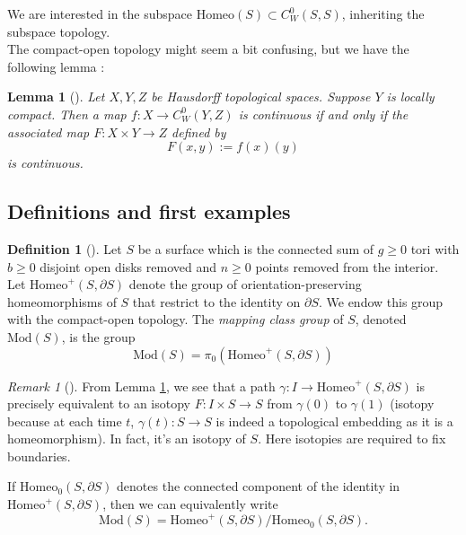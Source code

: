 \documentclass[reqno]{amsart}
\newtheorem{lemma}[theorem]{Lemma}
\theoremstyle{definition}
\newtheorem{definition}[theorem]{Definition}
\theoremstyle{remark}
\newtheorem*{remark}{Remark}
\newcommand{\Mod}{{\mathrm{Mod}}}
\newcommand{\Homeo}{{\mathrm{Homeo}}}
\begin{document}
We are interested in the subspace
$\Homeo (S) \subset C_W^{0} (S,S)$, inheriting the
subspace topology.\\
\linebreak
The compact-open topology might seem a bit confusing, but
we have the following lemma \cite[Prop A.14]{Hatcher}:

\begin{lemma}[]\label{compact-open-isotopy}
    Let $X,Y,Z$ be Hausdorff topological spaces.
    Suppose $Y$ is locally compact. Then a 
    map $f \colon X \to C_W^{0}(Y,Z)$ is
    continuous if and only if the associated map
    $F \colon X \times Y \to Z$ defined by
    \[
    F(x,y) := f(x)(y)
    \] 
    is continuous.
\end{lemma}





\subsection{Definitions and first examples}

\begin{definition}[]
    Let $S$ be a surface which is the connected sum of $g\ge 0$ 
    tori with $b \ge 0$ disjoint open disks removed and
    $n \ge 0$ points removed from the interior. Let
    $\Homeo^{+} \left( S, \partial S \right)$ denote the group
    of orientation-preserving homeomorphisms of $S$ that
    restrict to the identity on $\partial S$. We endow this
    group with the compact-open topology.
    The \textit{mapping class group} of  $S$, denoted
    $\Mod (S)$, is the group
    \[
    \Mod(S) = \pi_0 \left( \Homeo^{+} \left( S, \partial S
    \right) \right) 
    \] 


\begin{remark}[]
    From Lemma \ref{compact-open-isotopy}, we
    see that a path $\gamma \colon I \to 
    \Homeo^{+}\left( S, \partial S \right) $
    is precisely equivalent to an isotopy 
    $F \colon I \times S \to S$ from
    $\gamma(0)$ to $\gamma(1)$ (isotopy because at each
    time $t$, $\gamma(t) \colon S \to S$ is indeed a topological
    embedding as it is a homeomorphism). In fact, it's an isotopy
    of $S$. Here isotopies are required to fix
    boundaries.
\end{remark}





    If
    $\Homeo_0 (S, \partial S)$ denotes the connected component of
    the identity in $\Homeo^{+}\left( S, \partial S \right) $, then
    we can equivalently write
    \[
    \Mod (S) = \Homeo^{+} \left( S, \partial S \right) /
    \Homeo_0 \left( S, \partial S \right) .
    \] 
\end{definition}
\end{document}
